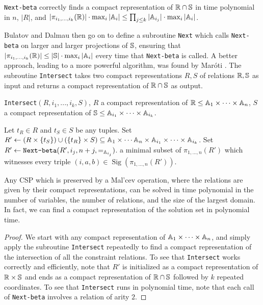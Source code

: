 \documentclass[letterpaper,11pt]{article}
\DeclareMathOperator{\Sig}{Sig}
\begin{document}
\begin{prop} \texttt{Next-beta} correctly finds a compact representation of $\mathbb{R} \cap \mathbb{S}$ in time polynomial in $n$, $|R|$, and $|\pi_{i_1, ..., i_k}(\mathbb{R})|\cdot \max_i |\mathbb{A}_i| \le \prod_{j \le k} |\mathbb{A}_{i_j}|\cdot \max_i |\mathbb{A}_i|$.
\end{prop}

Bulatov and Dalmau \cite{bulatov-dalmau-malcev} then go on to define a subroutine \texttt{Next} which calls \texttt{Next-beta} on larger and larger projections of $\mathbb{S}$, ensuring that $|\pi_{i_1, ..., i_k}(\mathbb{R})| \le |\mathbb{S}| \cdot \max_i |\mathbb{A}_i|$ every time that \texttt{Next-beta} is called. A better approach, leading to a more powerful algorithm, was found by Mar\'oti \cite{malcev-on-top}. The subroutine \texttt{Intersect} takes two compact representations $R,S$ of relations $\mathbb{R}, \mathbb{S}$ as input and returns a compact representation of $\mathbb{R} \cap \mathbb{S}$ as output.

\begin{algorithm}
\caption{\texttt{Intersect}$(R, i_1, ..., i_k, S)$, $R$ a compact representation of $\mathbb{R} \le \mathbb{A}_1\times \cdots\times \mathbb{A}_n$, $S$ a compact representation of $\mathbb{S} \le \mathbb{A}_{i_1} \times \cdots \times \mathbb{A}_{i_k}$.}
\begin{algorithmic}[1]
\State Let $t_R \in R$ and $t_S \in S$ be any tuples.
\State Set $R' \gets (R \times \{t_S\}) \cup (\{t_R\}\times S) \subseteq \mathbb{A}_1 \times \cdots \mathbb{A}_n \times \mathbb{A}_{i_1} \times \cdots \times \mathbb{A}_{i_k}$.
\State Set $R' \gets \texttt{Next-beta}(R', i_j, n+j, =_{\mathbb{A}_{i_j}})$.
\EndFor
\State \Return a minimal subset of $\pi_{1, ..., n}(R')$ which witnesses every triple $(i,a,b) \in \Sig(\pi_{1, ..., n}(R'))$.
\end{algorithmic}
\end{algorithm}

\begin{thm} Any CSP which is preserved by a Mal'cev operation, where the relations are given by their compact representations, can be solved in time polynomial in the number of variables, the number of relations, and the size of the largest domain. In fact, we can find a compact representation of the solution set in polynomial time.
\end{thm}
\begin{proof} We start with any compact representation of $\mathbb{A}_1 \times \cdots \times \mathbb{A}_n$, and simply apply the subroutine \texttt{Intersect} repeatedly to find a compact representation of the intersection of all the constraint relations. To see that \texttt{Intersect} works correctly and efficiently, note that $R'$ is initialized as a compact representation of $\mathbb{R} \times \mathbb{S}$ and ends as a compact representation of $\mathbb{R}\cap \mathbb{S}$ followed by $k$ repeated coordinates. To see that \texttt{Intersect} runs in polynomial time, note that each call of \texttt{Next-beta} involves a relation of arity $2$.
\end{proof}
\end{document}
